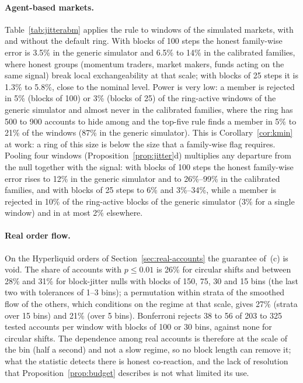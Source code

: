 \paragraph{Agent-based markets.} Table~\ref{tab:jitterabm} applies the rule to windows of the simulated markets, with and without the default ring. With blocks of 100 steps the honest family-wise error is 3.5\% in the generic simulator and 6.5\% to 14\% in the calibrated families, where honest groups (momentum traders, market makers, funds acting on the same signal) break local exchangeability at that scale; with blocks of 25 steps it is 1.3\% to 5.8\%, close to the nominal level. Power is very low: a member is rejected in 5\% (blocks of 100) or 3\% (blocks of 25) of the ring-active windows of the generic simulator and almost never in the calibrated families, where the ring has 500 to 900 accounts to hide among and the top-five rule finds a member in 5\% to 21\% of the windows (87\% in the generic simulator). This is Corollary~\ref{cor:kmin} at work: a ring of this size is below the size that a family-wise flag requires. Pooling four windows (Proposition~\ref{prop:jitter}d) multiplies any departure from the null together with the signal: with blocks of 100 steps the honest family-wise error rises to 12\% in the generic simulator and to 26\%--99\% in the calibrated families, and with blocks of 25 steps to 6\% and 3\%--34\%, while a member is rejected in 10\% of the ring-active blocks of the generic simulator (3\% for a single window) and in at most 2\% elsewhere. 

\begin{table}[t]
\centering\footnotesize
{}
\caption{Block-jitter rule at $\alpha=0.05$ in the agent-based markets (two markets per family, 16 to 24 episodes of 10 windows per market, default ring): share of windows without a ring in which a non-member is rejected, share of ring-active windows in which a member is rejected, and share in which a member is among the top five accounts}\label{tab:jitterabm}
\end{table}

\paragraph{Real order flow.} On the Hyperliquid orders of Section~\ref{sec:real-accounts} the guarantee of~(c) is void. The share of accounts with $p\le0.01$ is 26\% for circular shifts and between 28\% and 31\% for block-jitter nulls with blocks of 150, 75, 30 and 15 bins (the last two with tolerances of 1--3 bins); a permutation within strata of the smoothed flow of the others, which conditions on the regime at that scale, gives 27\% (strata over 15 bins) and 21\% (over 5 bins). Bonferroni rejects 38 to 56 of 203 to 325 tested accounts per window with blocks of 100 or 30 bins, against none for circular shifts. The dependence among real accounts is therefore at the scale of the bin (half a second) and not a slow regime, so no block length can remove it; what the statistic detects there is honest co-reaction, and the lack of resolution that Proposition~\ref{prop:budget} describes is not what limited its use.

